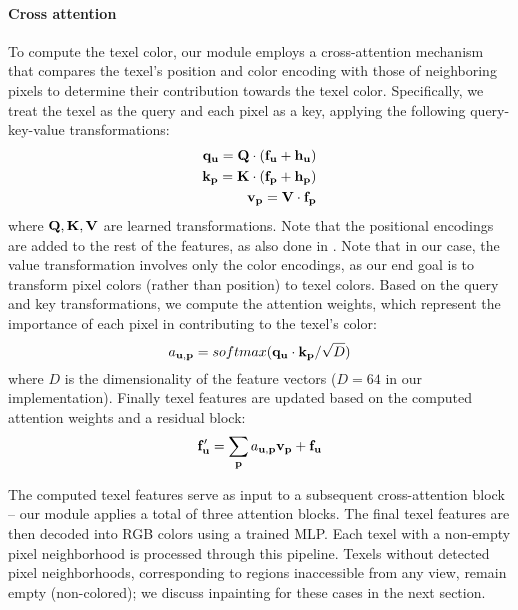 \paragraph{Cross attention}
To compute the texel color, our module employs a cross-attention mechanism that compares the texel's position and color encoding with those of neighboring pixels to determine their contribution towards the texel color. Specifically, we treat the texel as the query and each pixel as a key, applying the following query-key-value transformations:
\begin{align}
\mathbf{q}_{\mathbf{u}} = \mathbf{Q} \cdot ( \mathbf{f}_{\mathbf{u}} + \mathbf{h}_{\mathbf{u}} ) \\
\mathbf{k}_{\mathbf{p}} = \mathbf{K} \cdot ( \mathbf{f}_{\mathbf{p}} + \mathbf{h}_{\mathbf{p}} ) \\
\mathbf{v}_{\mathbf{p}} = \mathbf{V} \cdot  \mathbf{f}_{\mathbf{p}} 
\end{align}
where $\mathbf{Q}, \mathbf{K}, \mathbf{V}$ are learned transformations. 
Note that the positional encodings are added to the rest of the features, as also done in 
\cite{Vaswani:2017:Attenion}. Note that in our case, the value transformation involves only the color 
encodings, as our end goal is to transform pixel colors (rather than position) to  texel 
colors. Based on the query and key transformations, we compute the attention weights, which 
represent the importance of each pixel in contributing to the texel's color:
\begin{equation}
a_{\mathbf{u}, \mathbf{p}} = softmax( \mathbf{q}_{\mathbf{u}} \cdot \mathbf{k}_{\mathbf{p}} / \sqrt{D} )
\end{equation}
where $D$ is the dimensionality of the feature vectors ($D=64$ in our implementation). Finally  texel features are updated based on the computed attention weights and a residual block: 
\begin{equation}
\mathbf{f}_{\mathbf{u}}' = \sum_{\mathbf{p}} a_{\mathbf{u}, \mathbf{p}} \mathbf{v}_{\mathbf{p}} + \mathbf{f}_{\mathbf{u}}
\end{equation}

The computed texel features serve as input to a subsequent cross-attention block -- our module applies a total of three attention blocks. The final texel features are then decoded into RGB colors using a trained MLP. Each texel with a non-empty pixel neighborhood is processed through this pipeline. Texels without detected pixel neighborhoods, corresponding to regions inaccessible from any view, remain empty (non-colored); we discuss inpainting for these cases in the next section.


